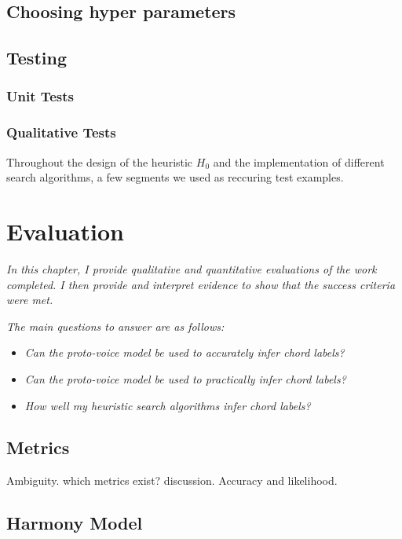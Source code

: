 \documentclass[12pt,a4paper,twoside,openright]{report}
\theoremstyle{definition}
\begin{document}
\section{Choosing hyper parameters}


\section{Testing}

\subsection{Unit Tests}

\subsection{Qualitative Tests}
 Throughout the design of the heuristic $H_0$ and the implementation of different search algorithms, a few segments we used as reccuring test examples.

\chapter{Evaluation}
\textit{In this chapter, I provide qualitative and quantitative evaluations of the work completed. I then provide and interpret evidence to show that the success criteria were met.}

\textit{The main questions to answer are as follows:}
\begin{itemize}
  \item \textit{Can the proto-voice model be used to accurately infer chord labels?}
  \item \textit{Can the proto-voice model be used to practically infer chord labels?}
  \item \textit{How well my heuristic search algorithms infer chord labels?}
\end{itemize}

\section{Metrics}
Ambiguity. which metrics exist? discussion.
Accuracy and likelihood.

\section{Harmony Model}
\end{document}
